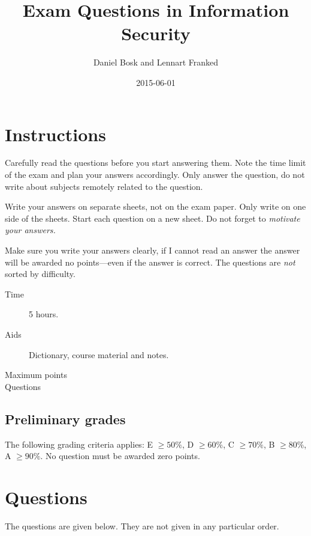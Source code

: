 \documentclass[a4paper,addpoints]{exam}
\title{Exam Questions in Information Security}
\date{2015-06-01}
\author{%
  Daniel Bosk
  and
  Lennart Franked
}
\affil{%
  Department of Information and Communication Systems\\
  Mid Sweden University, SE-851\,70 Sundsvall
}
\begin{document}
\maketitle
\thispagestyle{foot}

\section*{Instructions}
\label{sec:Instructions}
Carefully read the questions before you start answering them.
Note the time limit of the exam and plan your answers accordingly.
Only answer the question, do not write about subjects remotely related to the
question.

Write your answers on separate sheets, not on the exam paper.
Only write on one side of the sheets.
Start each question on a new sheet.
Do not forget to \emph{motivate your answers.}

Make sure you write your answers clearly, if I cannot read an answer the answer
will be awarded no points---even if the answer is correct.
The questions are \emph{not} sorted by difficulty.

\begin{description}
  \item[Time] 5 hours.
  \item[Aids] Dictionary, course material and notes.
  \item[Maximum points] \numpoints{}
  \item[Questions] \numquestions{}
\end{description}

\subsection*{Preliminary grades}
The following grading criteria applies:
E \(\geq 50\%\),
D \(\geq 60\%\),
C \(\geq 70\%\), 
B \(\geq 80\%\),
A \(\geq 90\%\).
No question must be awarded zero points.


\clearpage
\section*{Questions}
The questions are given below.
They are not given in any particular order.
\end{document}
